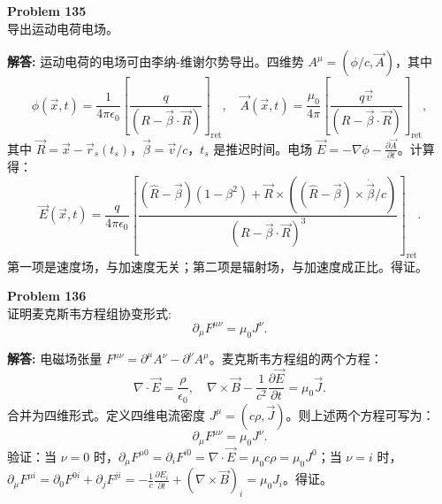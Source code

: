 \documentclass[12pt, a4paper, oneside]{ctexart}
\newenvironment{solution}{\par\noindent\textbf{解答:}\quad}{\par}
\begin{document}
\begin{mdframed}[backgroundcolor=gray!10, linewidth=0pt]
    \textbf{Problem 135} \\
    导出运动电荷电场。
\end{mdframed}
\begin{solution}
    运动电荷的电场可由李纳-维谢尔势导出。四维势 $A^\mu = (\phi/c, \vec{A})$，其中
    \[
    \phi(\vec{x}, t) = \frac{1}{4\pi\epsilon_0} \left[ \frac{q}{(R - \vec{\beta} \cdot \vec{R})} \right]_{\text{ret}}, \quad
    \vec{A}(\vec{x}, t) = \frac{\mu_0}{4\pi} \left[ \frac{q \vec{v}}{(R - \vec{\beta} \cdot \vec{R})} \right]_{\text{ret}},
    \]
    其中 $\vec{R} = \vec{x} - \vec{r}_s(t_s)$，$\vec{\beta} = \vec{v}/c$，$t_s$ 是推迟时间。电场 $\vec{E} = -\nabla \phi - \frac{\partial \vec{A}}{\partial t}$。计算得：
    \[
    \vec{E}(\vec{x}, t) = \frac{q}{4\pi\epsilon_0} \left[ \frac{(\hat{R} - \vec{\beta})(1 - \beta^2) + \vec{R} \times ((\hat{R} - \vec{\beta}) \times \dot{\vec{\beta}}/c)}{(R - \vec{\beta} \cdot \vec{R})^3} \right]_{\text{ret}}.
    \]
    第一项是速度场，与加速度无关；第二项是辐射场，与加速度成正比。得证。
\end{solution}

\begin{mdframed}[backgroundcolor=gray!10, linewidth=0pt]
    \textbf{Problem 136} \\
    证明麦克斯韦方程组协变形式:
    \[
    \partial_\mu F^{\mu\nu} = \mu_0 J^\nu.
    \]
\end{mdframed}
\begin{solution}
    电磁场张量 $F^{\mu\nu} = \partial^\mu A^\nu - \partial^\nu A^\mu$。麦克斯韦方程组的两个方程：
    \[
    \nabla \cdot \vec{E} = \frac{\rho}{\epsilon_0}, \quad \nabla \times \vec{B} - \frac{1}{c^2} \frac{\partial \vec{E}}{\partial t} = \mu_0 \vec{J}.
    \]
    合并为四维形式。定义四维电流密度 $J^\mu = (c\rho, \vec{J})$。则上述两个方程可写为：
    \[
    \partial_\mu F^{\mu\nu} = \mu_0 J^\nu.
    \]
    验证：当 $\nu=0$ 时，$\partial_\mu F^{\mu0} = \partial_i F^{i0} = \nabla \cdot \vec{E} = \mu_0 c \rho = \mu_0 J^0$；当 $\nu=i$ 时，$\partial_\mu F^{\mu i} = \partial_0 F^{0i} + \partial_j F^{ji} = -\frac{1}{c} \frac{\partial E_i}{\partial t} + (\nabla \times \vec{B})_i = \mu_0 J_i$。得证。
\end{solution}
\end{document}
